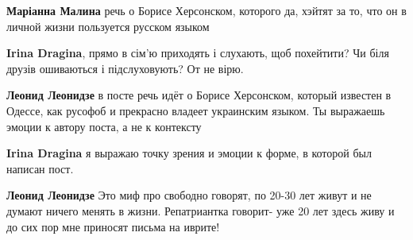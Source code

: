 \begin{itemize}
\begin{itemize}
 
\textbf{Маріанна Малина} речь о Борисе Херсонском, которого да, хэйтят за то, что он в личной жизни пользуется русском языком

 
\textbf{Irina Dragina}, прямо в сім'ю приходять і слухають, щоб похейтити? Чи біля друзів ошиваються і підслуховують? От не вірю.

 
\textbf{Леонид Леонидзе} в посте речь идёт о Борисе Херсонском, который известен в Одессе, как русофоб и прекрасно владеет украинским языком. Ты выражаешь эмоции к автору поста, а не к контексту

 
\textbf{Irina Dragina} я выражаю точку зрения и эмоции к форме, в которой был написан пост.

 
\textbf{Леонид Леонидзе} Это миф про свободно говорят, по 20-30 лет живут и не думают ничего менять в жизни. Репатриантка говорит- уже 20 лет здесь живу и до сих пор мне приносят письма на иврите!

 

\end{itemize}
\end{itemize}
